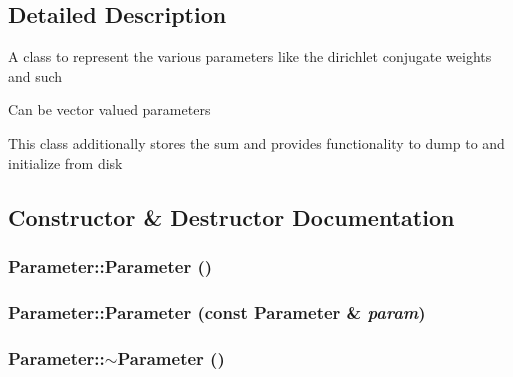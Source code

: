 \subsection{Detailed Description}
A class to represent the various parameters like the dirichlet conjugate weights and such

Can be vector valued parameters

This class additionally stores the sum and provides functionality to dump to and initialize from disk 

\subsection{Constructor \& Destructor Documentation}
\hypertarget{struct_parameter_a5ba93ca36c3261d3850e67f92717c2f5}{
\subsubsection[{Parameter}]{\setlength{\rightskip}{0pt plus 5cm}Parameter::Parameter ()}}
\label{struct_parameter_a5ba93ca36c3261d3850e67f92717c2f5}
\hypertarget{struct_parameter_af74ffe8ba8d86ce71d061a2147d54f46}{
\subsubsection[{Parameter}]{\setlength{\rightskip}{0pt plus 5cm}Parameter::Parameter (const {\bf Parameter} \& {\em param})}}
\label{struct_parameter_af74ffe8ba8d86ce71d061a2147d54f46}
\hypertarget{struct_parameter_a6e2ade42a712f1d3675653329266e42d}{
\subsubsection[{$\sim$Parameter}]{\setlength{\rightskip}{0pt plus 5cm}Parameter::$\sim$Parameter ()}}
\label{struct_parameter_a6e2ade42a712f1d3675653329266e42d}


